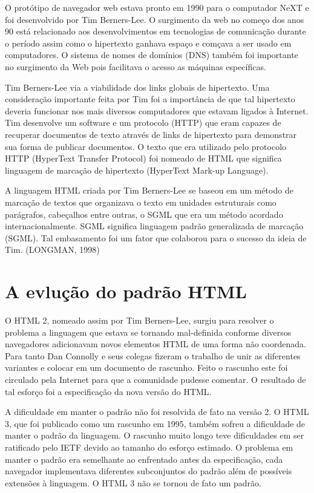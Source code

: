 O protótipo de navegador web estava pronto em 1990 para o computador NeXT e foi desenvolvido por Tim Berners-Lee. O surgimento da web no começo dos anos 90 está relacionado aos desenvolvimentos em tecnologias de comunicação durante o período assim como o hipertexto ganhava espaço e comçava a ser usado em computadores. O sistema de nomes de domínios (DNS) também foi importante no surgimento da Web pois facilitava o acesso as máquinas específicas.

Tim Berners-Lee via a viabilidade dos links globais de hipertexto. Uma consideração importante feita por Tim foi a importância de que tal hipertexto deveria funcionar nos mais diversos computadores que estavam ligados à Internet. Tim desenvolve um software e um protocolo (HTTP) que eram capazes de recuperar documentos de texto através de links de hipertexto para demonstrar sua forma de publicar documentos. O texto que era utilizado pelo protocolo HTTP (HyperText Transfer Protocol) foi nomeado de HTML que significa linguagem de marcação de hipertexto (HyperText Mark-up Language).

A linguagem HTML criada por Tim Berners-Lee se baseou em um método de marcação de textos que organizava o texto em unidades estruturais como parágrafos, cabeçalhos entre outras, o SGML que era um método acordado internacionalmente. SGML significa linguagem padrão generalizada de marcação (SGML). Tal embasamento foi um fator que colaborou para o sucesso da ideia de Tim. (LONGMAN, 1998)

\section{A evlução do padrão HTML}
O HTML 2, nomeado assim por Tim Berners-Lee, surgiu para resolver o problema a linguagem que estava se tornando mal-definida conforme diversos navegadores adicionavam novos elementos HTML de uma forma não coordenada. Para tanto Dan Connolly e seus colegas fizeram o trabalho de unir as diferentes variantes e colocar em um documento de rascunho. Feito o rascunho este foi circulado pela Internet para que a comunidade pudesse comentar. O resultado de tal esforço foi a especificação da nova versão do HTML.

A dificuldade em manter o padrão não foi resolvida de fato na versão 2. O HTML 3, que foi publicado como um rascunho em 1995, também sofreu a dificuldade de manter o padrão da linguagem. O rascunho muito longo teve dificuldades em ser ratificado pelo IETF devido ao tamanho do esforço estimado. O problema em manter o padrão era semelhante ao enfrentado antes da especificação, cada navegador implementava diferentes subconjuntos do padrão além de possíveis extensões à linguagem. O HTML 3 não se tornou de fato um padrão.

